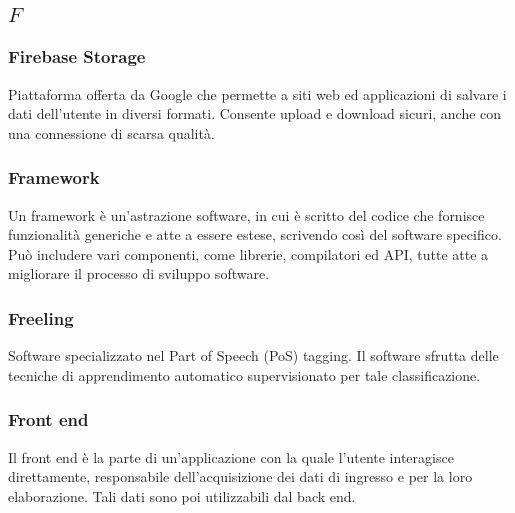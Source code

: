 \subsection*{\quad$F\quad$}
\subsubsection*{Firebase Storage}
Piattaforma offerta da Google che permette a siti web ed applicazioni di salvare i dati dell'utente in diversi formati. Consente upload e download sicuri, anche con una connessione di scarsa qualità.

\subsubsection*{Framework}
Un framework è un'astrazione software, in cui è scritto del codice che fornisce funzionalità generiche e atte a essere estese, scrivendo così del software specifico. Può includere vari componenti, come librerie, compilatori ed API\glo, tutte atte a migliorare il processo di sviluppo software.

\subsubsection*{Freeling}
Software specializzato nel Part of Speech (PoS) tagging\glo. Il software sfrutta delle tecniche di apprendimento automatico supervisionato per tale classificazione.  

\subsubsection*{Front end}
Il front end è la parte di un'applicazione con la quale l'utente interagisce direttamente, responsabile dell’acquisizione dei dati di ingresso e per la loro elaborazione. Tali dati sono poi utilizzabili dal back end\glo. 


